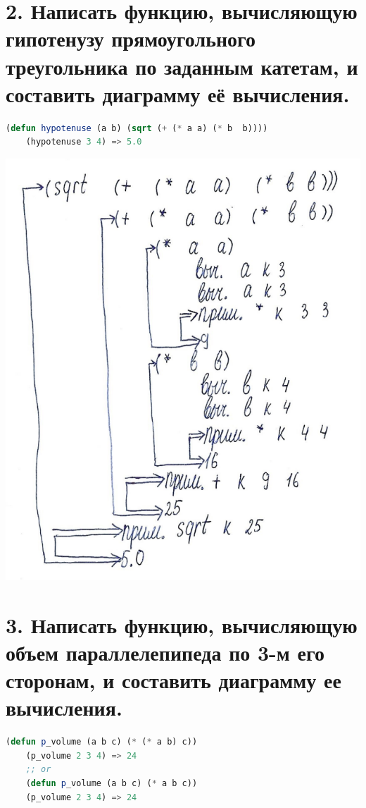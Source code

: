 \documentclass[12pt]{report}
\begin{document}
\clearpage
\section*{2. Написать функцию, вычисляющую гипотенузу прямоугольного треугольника по заданным катетам, и составить диаграмму её вычисления.}

\begin{lstlisting}[language=Lisp]
	(defun hypotenuse (a b) (sqrt (+ (* a a) (* b  b))))
	(hypotenuse 3 4) => 5.0 
\end{lstlisting}

\includegraphics[scale=1]{img/2}

\clearpage
\section*{3. Написать функцию, вычисляющую объем параллелепипеда по 3-м его сторонам, и составить диаграмму ее вычисления.}

\begin{lstlisting}[language=Lisp]
	(defun p_volume (a b c) (* (* a b) c))
	(p_volume 2 3 4) => 24 
	;; or
	(defun p_volume (a b c) (* a b c))
	(p_volume 2 3 4) => 24 
\end{lstlisting}
\end{document}
